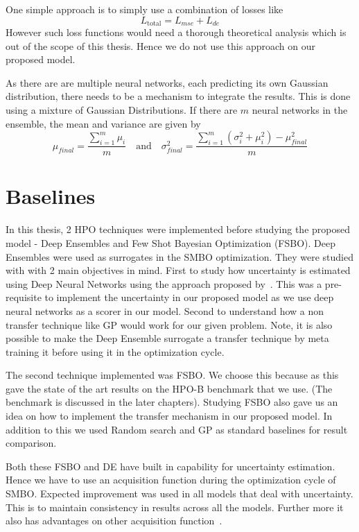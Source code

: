 \documentclass[12pt, twoside, ngerman]{report}
\begin{document}
One simple approach is to simply use a combination of losses like
$$
L_{\textrm{total}} = L_{mse} + L_{de}
$$
However such loss functions would need a thorough theoretical analysis which is out of the scope of this thesis.
Hence we do not use this approach on our proposed model.

As there are are multiple neural networks, each predicting its own Gaussian distribution,
there needs to be a mechanism to integrate the results.
This is done using a mixture of Gaussian Distributions.
If there are $m$ neural networks in the ensemble,  the mean and variance are given by
$$
\mu_{final} =  \frac{\sum\limits_{i=1}^{m} \mu_i}{m} \quad \textrm{and} \quad \sigma_{final}^2 = \frac{\sum\limits_{i=1}^{m} (\sigma_i^2 + \mu_i^2) - \mu_{final}^2}{m}
$$

\section{Baselines}

In this thesis,  2 HPO techniques were implemented before studying the proposed model - Deep Ensembles and Few Shot Bayesian Optimization (FSBO).
Deep Ensembles were used as surrogates in the SMBO optimization.
They were studied with with 2 main objectives in mind.
First to study how uncertainty is estimated using Deep Neural Networks using the approach proposed by~\cite{DeepEnsemblePaper}.
This was a pre-requisite to implement the uncertainty in our proposed model as we use deep neural networks as a scorer in our model. 
Second to understand how a non transfer technique like GP would work for our given problem.
Note,  it is also possible to make the Deep Ensemble surrogate a transfer technique by meta training it before using it in the optimization cycle.

The second technique implemented was FSBO.
We choose this because as this gave the state of the art results on the HPO-B benchmark that we use.
(The benchmark is discussed in the later chapters).
Studying FSBO also gave us an idea on how to implement the transfer mechanism in our proposed model.
In addition to this we used Random search and GP as standard baselines for result comparison.

Both these FSBO and DE have built in capability for uncertainty estimation.
Hence we have to use an acquisition function during the optimization cycle of SMBO.
Expected improvement was used in all models that deal with uncertainty.
This is to maintain consistency in results across all the models.
Further more it also has advantages on other acquisition function~\cite{Jones1998}.
\end{document}
